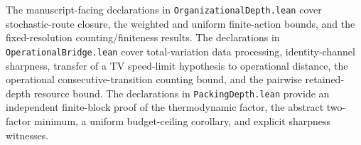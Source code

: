 The manuscript-facing declarations in \nolinkurl{OrganizationalDepth.lean}
cover stochastic-route closure, the weighted and uniform finite-action
bounds, and the fixed-resolution counting/finiteness results. The declarations in \nolinkurl{OperationalBridge.lean} cover total-variation
data processing, identity-channel sharpness, transfer of a TV speed-limit
hypothesis to operational distance, the operational consecutive-transition
counting bound, and the pairwise retained-depth resource bound.
The declarations in \nolinkurl{PackingDepth.lean} provide an independent
finite-block proof of the thermodynamic factor, the abstract two-factor
minimum, a uniform budget-ceiling corollary, and explicit sharpness witnesses.

\endgroup
